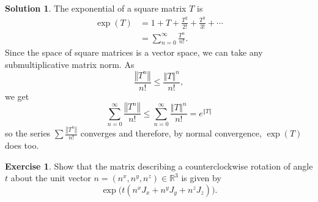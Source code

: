 \documentclass[11pt, a4paper]{report}
\theoremstyle{definition}
\newtheorem{ex}{Exercise}[part]
\newtheorem{sol}{Solution}[part]
\newcommand*{\norm}[1]{\ensuremath{\left\Vert#1\right\Vert}}
\renewcommand{\leq}{\leqslant}
\begin{document}
\begin{sol}

The exponential of a square matrix $T$ is
\begin{align*}
    \exp(T) &= 1 + T + \frac{T^2}{2!} + \frac{T^3}{3!} + \cdots \\
            &= \sum_{n = 0}^\infty \frac{T^n}{n!}.
\end{align*}
Since the space of square matrices is a vector space, we can take any submultiplicative matrix norm. As
\[
    \frac{\norm{T^n}}{n!} \leq \frac{\norm{T}^n}{n!},
\]
we get
\[
    \sum_{n = 0}^\infty \frac{\norm{T^n}}{n!} \leq \sum_{n = 0}^\infty \frac{\norm{T}^n}{n!} = e^{\norm{T}}
\]
so the series $\sum \frac{\norm{T^n}}{n!}$ converges and therefore, by normal convergence, $\exp(T)$ does too.

\end{sol}

\begin{ex}

Show that the matrix describing a counterclockwise rotation of angle $t$ about the unit vector $n = (n^x, n^y, n^z) \in \mathbb{R}^3$ is given by
\[
    \exp \bigl( t(n^x \! J_x + n^y \! J_y + n^z \! J_z) \bigr).
\]

\end{ex}
\end{document}
